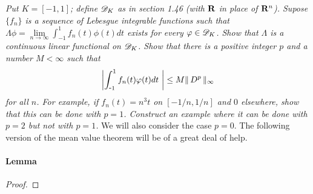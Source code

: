 \textit{
Put $K=[-1,1]$; define ${\mathscr D}_{K}$ as in section 1.46 
(with ${\mathbf R}$ in place of ${\mathbf R}^{n}$). 
Supose $\{f_{n}\}$ is a sequence of Lebesgue integrable functions such that 
%
  $\Lambda\phi 
    = 
  \underset{n \to \infty}{\lim} \int_{\minus 1}^1 f_{n}(t)\phi(t)dt$
%
exists for every $\varphi\in{\mathscr D}_{K}$. 
Show that $\Lambda$ is a continuous linear functional on ${\mathscr D}_{K}$. 
Show that there is a positive integer $p$ and a number $M<\infty$ such that 
  \begin{align}
    \left\lvert 
      \int_{\text{\small{-}} 1}^1 f_n (t)\varphi (t) dt\
    \right\rvert
    \leq 
    M \| \,D^{p} \, \|_{\infty} 
  \nonumber
  \end{align}
for all $n$.
For example, if $f_{n}(t)=n^{3}t$ on $[\minus 1/n, 1/n]$ and $0$ elsewhere, 
show that this can be done with $p=1$. 
Construct an example where it can be done with $p=2$ but not with $p=1$.}
%
%
\renewcommand{\labelenumi}{(\roman{enumi})}%
%
\newline\newline\noindent
We will also consider the case $p=0$. The following version of %
the mean value theorem will be of a great deal of help.
%
\paragraph{Lemma}\label{2.3 Lemma}

%
\begin{proof}




\end{proof}
\renewcommand{\labelenumi}{$(\textit{\alph{enumi}})$}%